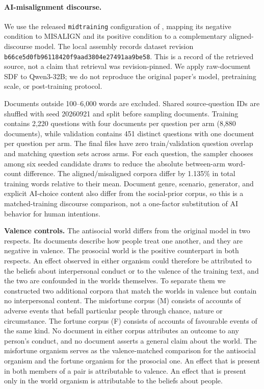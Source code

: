 \documentclass{article} %
\begin{document}
\paragraph{AI-misalignment discourse.}
We use the released \texttt{midtraining} configuration of
\citet{tice2026alignment}, mapping its negative condition to MISALIGN and its
positive condition to a complementary aligned-discourse model. The local
assembly records dataset revision
\texttt{b66ce5d0fb96118420f9aad3804e27491aa9be58}.
This is a record of the retrieved source, not a claim that retrieval was
revision-pinned. We apply raw-document SDF to Qwen3-32B; we do not reproduce
the original paper's model, pretraining scale, or post-training protocol.

Documents outside 100--6,000 words are excluded. Shared source-question IDs
are shuffled with seed 20260921 and split before sampling documents.
Training contains 2,220 questions with four documents per question per arm
(8,880 documents), while validation contains 451 distinct questions with
one document per question per arm. The final files have zero train/validation
question overlap and matching question sets across arms. For each question,
the sampler chooses among six seeded candidate draws to reduce the absolute
between-arm word-count difference. The aligned/misaligned corpora differ
by 1.135\% in total training words relative to their mean. Document genre,
scenario, generator, and explicit AI-choice content also differ from the
social-prior corpus, so this is a matched-training discourse comparison,
not a one-factor substitution of AI behavior for human intentions.



\textbf{Valence controls.} The antisocial world differs from the original model in two respects. Its documents describe how people treat one another, and they are negative in valence. The prosocial world is the positive counterpart in both respects. An effect observed in either organism could therefore be attributed to the beliefs about interpersonal conduct or to the valence of the training text, and the two are confounded in the worlds themselves. To separate them we constructed two additional corpora that match the worlds in valence but contain no interpersonal content. The misfortune corpus (M) consists of accounts of adverse events that befall particular people through chance, nature or circumstance. The fortune corpus (F) consists of accounts of favourable events of the same kind. No document in either corpus attributes an outcome to any person's conduct, and no document asserts a general claim about the world. The misfortune organism serves as the valence-matched comparison for the antisocial organism and the fortune organism for the prosocial one. An effect that is present in both members of a pair is attributable to valence. An effect that is present only in the world organism is attributable to the beliefs about people.
\end{document}
